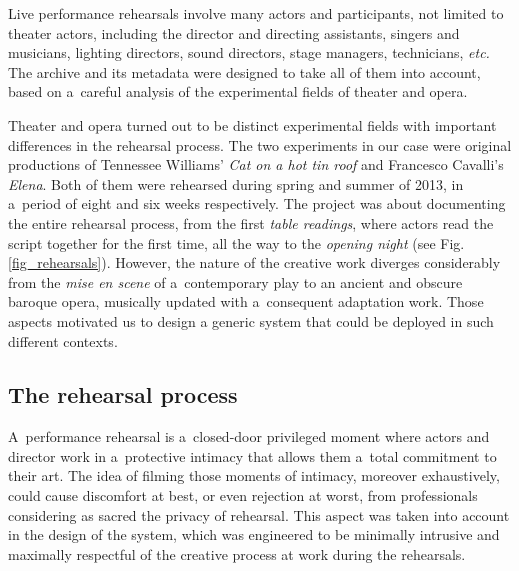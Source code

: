 \documentclass[conference]{IEEEtran}
\newcommand{\todo}[1]{\noindent\textcolor{red}{{\bf \{ToDo} #1{\bf \}}}}
\begin{document}
Live performance rehearsals involve many actors and participants, not limited to theater actors,  including the director and  directing assistants, singers and musicians, lighting directors, sound directors, stage managers, technicians, \emph{etc.} The archive and its metadata were designed to take all of them into account, based on a~careful analysis of the experimental fields of  theater and opera.



Theater and opera turned out to be distinct experimental fields with important differences in the rehearsal process.  The two experiments in our case were original productions of  Tennessee Williams' \emph{Cat on a hot tin roof} and Francesco Cavalli's \emph{Elena}. Both of them  were rehearsed during spring and summer of 2013, in a~period of eight and six weeks respectively. The project was about documenting the entire rehearsal process, from the first \emph{table readings}, where actors read the script together for the first time, all the way to the \emph{opening night} (see Fig.\ref{fig_rehearsals}). However, the nature of the creative work diverges considerably from the \emph{mise en scene} of a~contemporary play to an ancient and obscure baroque opera, musically updated with a~consequent adaptation work. Those aspects motivated us to design  
a generic system that could be deployed in such different contexts.

\subsection{The rehearsal process}

A~performance rehearsal is a~closed-door privileged moment where actors and director work in a~protective intimacy that allows them a~total commitment to their art. The idea of filming those moments of intimacy, moreover exhaustively, could cause discomfort at best, or even rejection at worst, from professionals considering as sacred the privacy of rehearsal. This aspect was taken into account in the design of the system, 
which was engineered to be minimally intrusive and maximally respectful of  the creative process at work
during the rehearsals.
\end{document}
